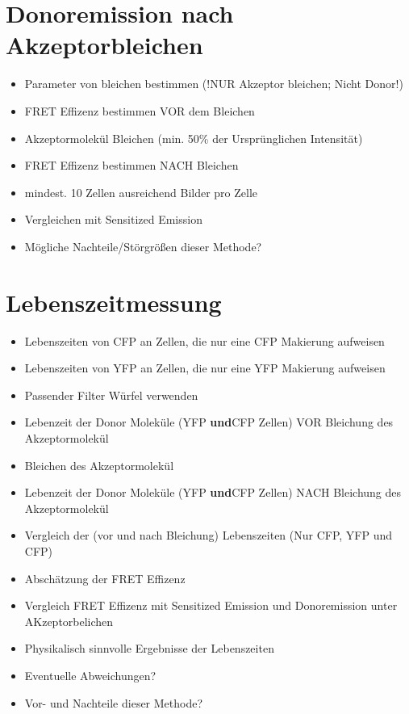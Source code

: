\documentclass[a4paper, twoside]{article}
\begin{document}
\section{Donoremission nach Akzeptorbleichen}
\begin{itemize}
    \item Parameter von bleichen bestimmen (!NUR Akzeptor bleichen; Nicht Donor!)
    \item FRET Effizenz bestimmen VOR dem Bleichen
    \item Akzeptormolekül Bleichen  (min. 50\% der Ursprünglichen Intensität)
    \item FRET Effizenz bestimmen NACH Bleichen
    \item mindest. 10 Zellen ausreichend Bilder pro Zelle
    \item Vergleichen mit Sensitized Emission
    \item Mögliche Nachteile/Störgrößen dieser Methode?
\end{itemize}
\section{Lebenszeitmessung}
\begin{itemize}
    \item Lebenszeiten von CFP an Zellen, die nur eine CFP Makierung aufweisen 
    \item Lebenszeiten von YFP an Zellen, die nur eine YFP Makierung aufweisen 
    \item Passender Filter Würfel verwenden
    \item Lebenzeit der Donor Moleküle (YFP \textbf{und}CFP Zellen) VOR Bleichung des Akzeptormolekül
    \item Bleichen des Akzeptormolekül
    \item Lebenzeit der Donor Moleküle (YFP \textbf{und}CFP Zellen) NACH Bleichung des Akzeptormolekül
    \item Vergleich der (vor und nach Bleichung) Lebenszeiten (Nur CFP, YFP und CFP)
    \item Abschätzung der FRET Effizenz
    \item Vergleich FRET Effizenz mit Sensitized Emission und Donoremission unter AKzeptorbelichen
    \item Physikalisch sinnvolle Ergebnisse der Lebenszeiten
    \item Eventuelle Abweichungen?
    \item Vor- und Nachteile dieser Methode?
\end{itemize}
\end{document}
